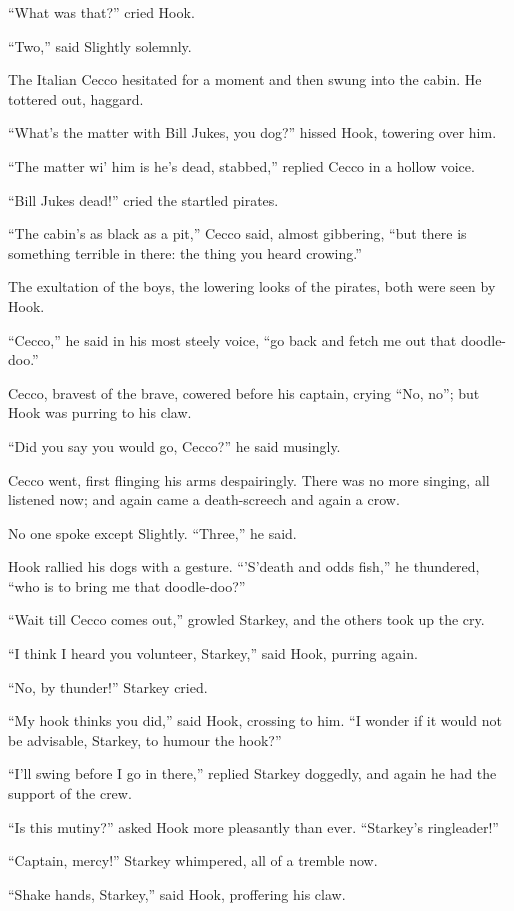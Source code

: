 ``What was that?'' cried Hook.

``Two,'' said Slightly solemnly.

The Italian Cecco hesitated for a moment and then swung into the cabin.
He tottered out, haggard.

``What's the matter with Bill Jukes, you dog?'' hissed Hook, towering
over him.

``The matter wi' him is he's dead, stabbed,'' replied Cecco in a hollow
voice.

``Bill Jukes dead!'' cried the startled pirates.

``The cabin's as black as a pit,'' Cecco said, almost gibbering, ``but
there is something terrible in there: the thing you heard crowing.''

The exultation of the boys, the lowering looks of the pirates, both
were seen by Hook.

``Cecco,'' he said in his most steely voice, ``go back and fetch me out
that doodle-doo.''

Cecco, bravest of the brave, cowered before his captain, crying ``No,
no''; but Hook was purring to his claw.

``Did you say you would go, Cecco?'' he said musingly.

Cecco went, first flinging his arms despairingly. There was no more
singing, all listened now; and again came a death-screech and again a
crow.

No one spoke except Slightly. ``Three,'' he said.

Hook rallied his dogs with a gesture. ``'S'death and odds fish,'' he
thundered, ``who is to bring me that doodle-doo?''

``Wait till Cecco comes out,'' growled Starkey, and the others took up
the cry.

``I think I heard you volunteer, Starkey,'' said Hook, purring again.

``No, by thunder!'' Starkey cried.

``My hook thinks you did,'' said Hook, crossing to him. ``I wonder if it
would not be advisable, Starkey, to humour the hook?''

``I'll swing before I go in there,'' replied Starkey doggedly, and again
he had the support of the crew.

``Is this mutiny?'' asked Hook more pleasantly than ever. ``Starkey's
ringleader!''

``Captain, mercy!'' Starkey whimpered, all of a tremble now.

``Shake hands, Starkey,'' said Hook, proffering his claw.

